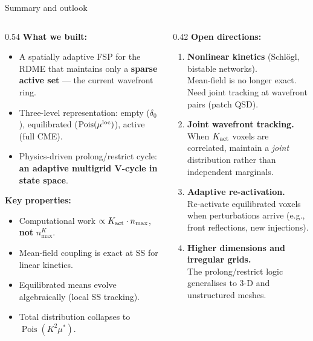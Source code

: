 \documentclass[10pt,aspectratio=169]{beamer}
\newcommand{\Pois}{\operatorname{Pois}}
\begin{document}
\begin{frame}{Summary and outlook}

  \begin{columns}[T]
    \begin{column}{0.54\textwidth}
      \textbf{What we built:}
      \begin{itemize}\setlength\itemsep{0.45em}
        \item A spatially adaptive FSP for the RDME that maintains only a
              \textbf{sparse active set} — the current wavefront ring.
        \item Three-level representation: empty ($\delta_0$),
              equilibrated ($\Pois(\mu^{\rm loc})$), active (full CME).
        \item Physics-driven prolong/restrict cycle:
              \textbf{an adaptive multigrid V-cycle in state space}.
      \end{itemize}

      \bigskip
      \textbf{Key properties:}
      \begin{itemize}\setlength\itemsep{0.35em}
        \item Computational work $\propto K_{\rm act} \cdot n_{\max}$,
              \textbf{not} $n_{\max}^K$.
        \item Mean-field coupling is exact at SS for linear kinetics.
        \item Equilibrated means evolve algebraically (local SS tracking).
        \item Total distribution collapses to $\Pois(K^2\mu^*)$.
      \end{itemize}
    \end{column}
    \begin{column}{0.42\textwidth}
      \textbf{Open directions:}
      \begin{enumerate}\setlength\itemsep{0.45em}
        \item \textbf{Nonlinear kinetics} (Schlögl, bistable networks).\\
              Mean-field is no longer exact. Need joint tracking at
              wavefront pairs (patch QSD).
        \item \textbf{Joint wavefront tracking.}\\
              When $K_{\rm act}$ voxels are correlated, maintain a
              \emph{joint} distribution rather than independent marginals.
        \item \textbf{Adaptive re-activation.}\\
              Re-activate equilibrated voxels when perturbations arrive
              (e.g., front reflections, new injections).
        \item \textbf{Higher dimensions and irregular grids.}\\
              The prolong/restrict logic generalises to 3-D and
              unstructured meshes.
      \end{enumerate}
    \end{column}
  \end{columns}

\end{frame}
\end{document}
